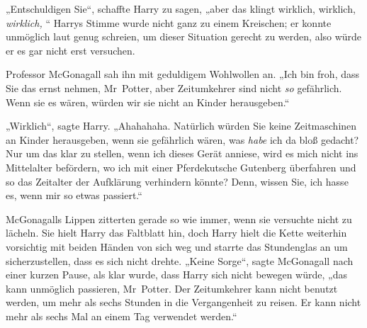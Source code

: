 „Entschuldigen Sie“, schaffte Harry zu sagen, „aber das klingt wirklich, wirklich, \emph{wirklich, }“ Harrys Stimme wurde nicht ganz zu einem Kreischen; er konnte unmöglich laut genug schreien, um dieser Situation gerecht zu werden, also würde er es gar nicht erst versuchen.

Professor McGonagall sah ihn mit geduldigem Wohlwollen an. „Ich bin froh, dass Sie das ernst nehmen, Mr~Potter, aber Zeitumkehrer sind nicht \emph{so} gefährlich. Wenn sie es wären, würden wir sie nicht an Kinder herausgeben.“

„Wirklich“, sagte Harry. „Ahahahaha. Natürlich würden Sie keine Zeitmaschinen an Kinder herausgeben, wenn sie gefährlich wären, was \emph{habe} ich da bloß gedacht? Nur um das klar zu stellen, wenn ich dieses Gerät anniese, wird es mich nicht ins Mittelalter befördern, wo ich mit einer Pferdekutsche Gutenberg überfahren und so das Zeitalter der Aufklärung verhindern könnte? Denn, wissen Sie, ich hasse es, wenn mir so etwas passiert.“

McGonagalls Lippen zitterten gerade so wie immer, wenn sie versuchte nicht zu lächeln. Sie hielt Harry das Faltblatt hin, doch Harry hielt die Kette weiterhin vorsichtig mit beiden Händen von sich weg und starrte das Stundenglas an um sicherzustellen, dass es sich nicht drehte. „Keine Sorge“, sagte McGonagall nach einer kurzen Pause, als klar wurde, dass Harry sich nicht bewegen würde, „das kann unmöglich passieren, Mr~Potter. Der Zeitumkehrer kann nicht benutzt werden, um mehr als sechs Stunden in die Vergangenheit zu reisen. Er kann nicht mehr als sechs Mal an einem Tag verwendet werden.“

